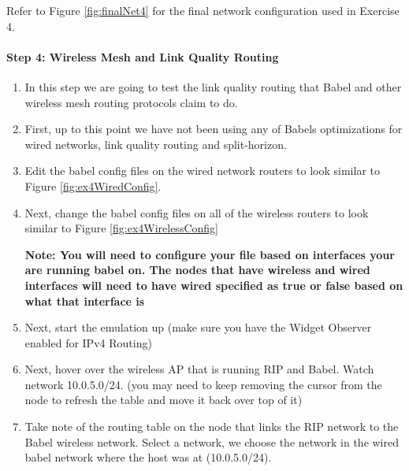 \documentclass[main.tex]{subfiles}
\begin{document}
\noindent  Refer to Figure \ref{fig:finalNet4} for the final network configuration used in Exercise 4.


\paragraph{Step 4: Wireless Mesh and Link Quality Routing}
\begin{enumerate}[noitemsep,label=$\bullet$,leftmargin=20mm,labelsep=0.5cm]

\item In this step we are going to test the link quality routing that Babel and other wireless mesh routing protocols claim to do.
\item First, up to this point we have not been using any of Babels optimizations for wired networks, link quality routing and split-horizon.  
\item Edit the babel config files on the wired network routers to look similar to Figure \ref{fig:ex4WiredConfig}.


\item Next, change the babel config files on all of the wireless routers to look similar to Figure \ref{fig:ex4WirelessConfig}


\textbf{Note: You will need to configure your file based on interfaces your are running babel on.  The nodes that have wireless and wired interfaces will need to have wired specified as true or false based on what that interface is}




\item Next, start the emulation up (make sure you have the Widget Observer enabled for IPv4 Routing)
\item Next, hover over the wireless AP that is running RIP and Babel.  Watch network 10.0.5.0/24. (you may need to keep removing the cursor from the node to refresh the table and move it back over top of it)

\item  Take note of the routing table on the node that links the RIP network to the Babel wireless network.  Select a network, we choose the network in the wired babel network where the host was at (10.0.5.0/24).  


\end{enumerate}
\end{document}
